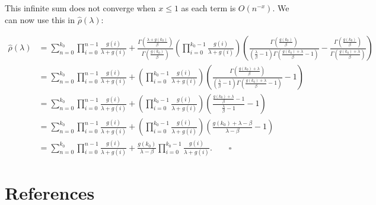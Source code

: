\documentclass[
  sn-basic,
]{sn-jnl}
\theoremstyle{plain}
\theoremstyle{plain}
\theoremstyle{remark}
\begin{document}
This infinite sum does not converge when \(x\le1\) as each term is
\(O(n^{-x})\). We can now use this in \(\hat\rho(\lambda)\):

\begin{align*}
\hat\rho(\lambda) &= \sum_{n=0}^{k_0}\prod_{i=0}^{n-1}\frac{g(i)}{\lambda+g(i)} + \frac{\Gamma\left(\frac{\lambda+g(k_0)}{\beta}\right)}{\Gamma\left(\frac{g(k_0)}{\beta}\right)}\left(\prod_{i=0}^{k_0-1}\frac{g(i)}{\lambda+g(i)}\right)\left(\frac{\Gamma\left(\frac{g(k_0)}{\beta}\right)}{\left(\frac{\lambda}{\beta}-1\right)\Gamma\left(\frac{g(k_0)+\lambda}{\beta}-1\right)}-\frac{\Gamma\left(\frac{g(k_0)}{\beta}\right)}{\Gamma\left(\frac{g(k_0)+\lambda}{\beta}\right)}\right)\\
&=\sum_{n=0}^{k_0}\prod_{i=0}^{n-1}\frac{g(i)}{\lambda+g(i)} + \left(\prod_{i=0}^{k_0-1}\frac{g(i)}{\lambda+g(i)}\right)\left(\frac{\Gamma\left(\frac{g(k_0)+\lambda}{\beta}\right)}{\left(\frac{\lambda}{\beta}-1\right)\Gamma\left(\frac{g(k_0)+\lambda}{\beta}-1\right)}-1\right)\\
&=\sum_{n=0}^{k_0}\prod_{i=0}^{n-1}\frac{g(i)}{\lambda+g(i)} + \left(\prod_{i=0}^{k_0-1}\frac{g(i)}{\lambda+g(i)}\right)\left(\frac{\frac{g(k_0)+\lambda}{\beta}-1}{\frac{\lambda}{\beta}-1}-1\right)\\
&=\sum_{n=0}^{k_0}\prod_{i=0}^{n-1}\frac{g(i)}{\lambda+g(i)} + \left(\prod_{i=0}^{k_0-1}\frac{g(i)}{\lambda+g(i)}\right)\left(\frac{g(k_0)+\lambda-\beta}{\lambda-\beta}-1\right)\\&=\sum_{n=0}^{k_0}\prod_{i=0}^{n-1}\frac{g(i)}{\lambda+g(i)} + \frac{g(k_0)}{\lambda-\beta}\prod_{i=0}^{k_0-1}\frac{g(i)}{\lambda+g(i)}.\qquad \square
\end{align*}

\newpage

\section*{References}\label{references}

\renewcommand{\bibsection}{}

\end{document}
